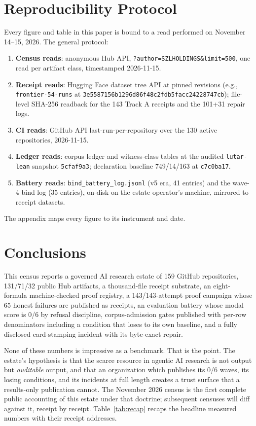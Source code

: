 \section{Reproducibility Protocol}
\label{sec:repro}

Every figure and table in this paper is bound to a read performed on November 14--15, 2026. The general protocol:
\begin{enumerate}
\item \textbf{Census reads}: anonymous Hub API, \texttt{?author=SZLHOLDINGS\&limit=500}, one read per artifact class, timestamped 2026-11-15.
\item \textbf{Receipt reads}: Hugging Face dataset tree API at pinned revisions (e.g., \texttt{frontier-54-runs} at \texttt{3e5587156b1296d86f48c2fdb5facc24228747cb}); file-level SHA-256 readback for the 143 Track A receipts and the 101+31 repair logs.
\item \textbf{CI reads}: GitHub API last-run-per-repository over the 130 active repositories, 2026-11-15.
\item \textbf{Ledger reads}: corpus ledger and witness-class tables at the audited \texttt{lutar-lean} snapshot \texttt{5cfaf9a3}; declaration baseline 749/14/163 at \texttt{c7c0ba17}.
\item \textbf{Battery reads}: \texttt{bind\_battery\_log.jsonl} (v5 era, 41 entries) and the wave-4 bind log (35 entries), on-disk on the estate operator's machine, mirrored to receipt datasets.
\end{enumerate}
The appendix maps every figure to its instrument and date.

\section{Conclusions}
\label{sec:concl}

This census reports a governed AI research estate of 159 GitHub repositories, 131/71/32 public Hub artifacts, a thousand-file receipt substrate, an eight-formula machine-checked proof registry, a 143/143-attempt proof campaign whose 65 honest failures are published as receipts, an evaluation battery whose modal score is 0/6 by refusal discipline, corpus-admission gates published with per-row denominators including a condition that loses to its own baseline, and a fully disclosed card-stamping incident with its byte-exact repair.

None of these numbers is impressive as a benchmark. That is the point. The estate's hypothesis is that the scarce resource in agentic AI research is not output but \emph{auditable} output, and that an organization which publishes its 0/6 waves, its losing conditions, and its incidents at full length creates a trust surface that a results-only publication cannot. The November 2026 census is the first complete public accounting of this estate under that doctrine; subsequent censuses will diff against it, receipt by receipt. Table~\ref{tab:recap} recaps the headline measured numbers with their receipt addresses.

